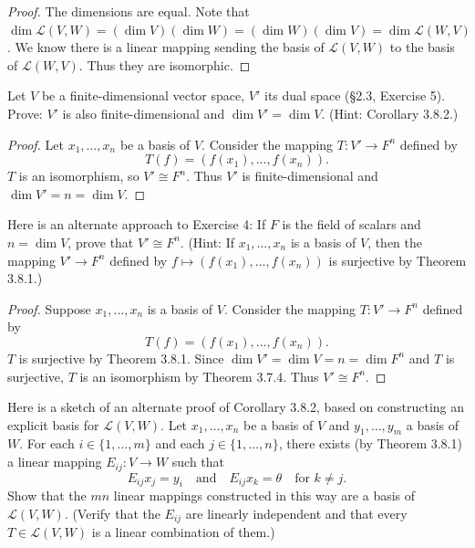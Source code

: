 \begin{proof}
    The dimensions are equal.
    Note that $\dim \mathcal{L}(V, W) = (\dim V)(\dim W) = (\dim W)(\dim V) = \dim \mathcal{L}(W, V)$.
    We know there is a linear mapping sending the basis of 
        $\mathcal{L}(V, W)$ to the basis 
        of $\mathcal{L}(W, V)$.
    Thus they are isomorphic.
\end{proof}

\begin{tcolorbox}[title=Exercise 4, breakable]
    Let $V$ be a finite-dimensional vector space, $V'$ its dual space (\S 2.3, 
    Exercise 5). Prove: $V'$ is also finite-dimensional and $\dim V' = \dim V$.
    (Hint: Corollary 3.8.2.)
\end{tcolorbox}

\begin{proof}
    Let $x_1, \ldots, x_n$ be a basis of $V$.
    Consider the mapping $T : V' \longrightarrow F^n$ defined by
    \[T(f) = (f(x_1), \ldots, f(x_n)).\]
    $T$ is an isomorphism, so $V' \cong F^n$.
    Thus $V'$ is finite-dimensional and $\dim V' = n = \dim V$.
\end{proof}

\begin{tcolorbox}[title=Exercise 5, breakable]
    Here is an alternate approach to Exercise 4: If $F$ is the field of scalars 
    and $n = \dim V$, prove that $V' \cong F^n$. (Hint: If $x_1, \ldots, x_n$ is 
    a basis of $V$, then the mapping $V' \to F^n$ defined by 
    $f \mapsto (f(x_1), \ldots, f(x_n))$ is surjective by Theorem 3.8.1.)
\end{tcolorbox}

\begin{proof}
    Suppose $x_1, \ldots, x_n$ is a basis of $V$.
    Consider the mapping $T : V' \longrightarrow F^n$ defined by
    \[T(f) = (f(x_1), \ldots, f(x_n)).\]
    $T$ is surjective by Theorem 3.8.1.
    Since $\dim V' = \dim V = n = \dim F^n$ and $T$ is surjective, $T$ is an isomorphism by Theorem 3.7.4.
    Thus $V' \cong F^n$.
\end{proof}


\begin{tcolorbox}[title=Exercise 6, breakable]
    Here is a sketch of an alternate proof of Corollary 3.8.2, 
    based on constructing an explicit basis for $\mathcal{L}(V, W)$. Let $x_1, \ldots, x_n$ 
    be a basis of $V$ and $y_1, \ldots, y_m$ a basis of $W$. For each $i \in \{1, \ldots, m\}$ 
    and each $j \in \{1, \ldots, n\}$, there exists (by Theorem 3.8.1) a linear mapping 
    $E_{ij} : V \to W$ such that
    \[E_{ij} x_j = y_i \quad \text{and} \quad E_{ij} x_k = \theta \quad \text{for } k \ne j.\]
    Show that the $mn$ linear mappings constructed in this way are a basis of 
    $\mathcal{L}(V, W)$. (Verify that the $E_{ij}$ are linearly independent and that every 
    $T \in \mathcal{L}(V, W)$ is a linear combination of them.)
\end{tcolorbox}

